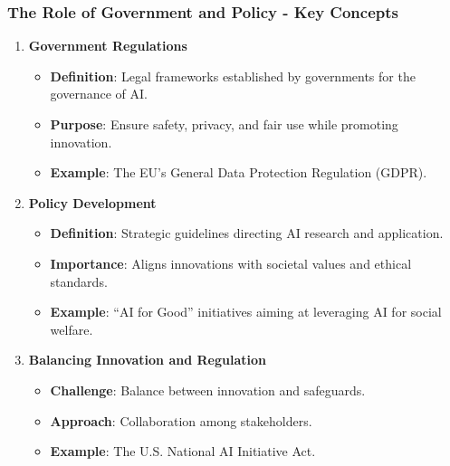 \documentclass{beamer}
\begin{document}
\begin{frame}[fragile]
    \frametitle{The Role of Government and Policy - Key Concepts}
    \begin{enumerate}
        \item \textbf{Government Regulations}
            \begin{itemize}
                \item \textbf{Definition}: Legal frameworks established by governments for the governance of AI.
                \item \textbf{Purpose}: Ensure safety, privacy, and fair use while promoting innovation.
                \item \textbf{Example}: The EU's General Data Protection Regulation (GDPR).
            \end{itemize}
        \item \textbf{Policy Development}
            \begin{itemize}
                \item \textbf{Definition}: Strategic guidelines directing AI research and application.
                \item \textbf{Importance}: Aligns innovations with societal values and ethical standards.
                \item \textbf{Example}: “AI for Good” initiatives aiming at leveraging AI for social welfare.
            \end{itemize}
        \item \textbf{Balancing Innovation and Regulation}
            \begin{itemize}
                \item \textbf{Challenge}: Balance between innovation and safeguards.
                \item \textbf{Approach}: Collaboration among stakeholders.
                \item \textbf{Example}: The U.S. National AI Initiative Act.
            \end{itemize}
    \end{enumerate}
\end{frame}
\end{document}
